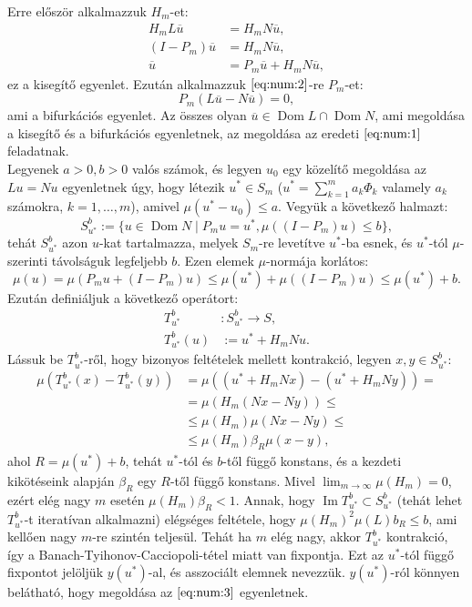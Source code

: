 \documentclass[oneside, titlepage, 12pt, a4paper]{report}
\DeclareMathOperator{\Ima}{Im}	%
\DeclareMathOperator{\Dom}{Dom}	%
\begin{document}
Erre először alkalmazzuk $H_m$-et:
\begin{align}
H_m L \overline{u} &= H_m N \overline{u}, \nonumber \\
(I - P_m) \overline{u} &= H_m N \overline{u}, \nonumber \\
\overline{u} &= P_m \overline{u} + H_m N \overline{u}, \label{eq:num:3}
\end{align}
ez a kisegítő egyenlet. Ezután alkalmazzuk $\eqref{eq:num:2}$-re $P_m$-et: %
\begin{equation}
P_m(L \overline{u} - N \overline{u}) = 0, \label{eq:num:4}
\end{equation}
ami a bifurkációs egyenlet. Az összes olyan $\overline{u} \in \Dom L \cap \Dom N$, ami megoldása a kisegítő és a bifurkációs egyenletnek, az megoldása az eredeti $\eqref{eq:num:1}$ feladatnak. \\ %
Legyenek $a > 0, b > 0$ valós számok, és legyen $u_0$ egy közelítő megoldása az $Lu = Nu$ egyenletnek úgy, hogy létezik $u^* \in S_m$ ($u^* = \sum_{k=1}^m a_k \Phi_k$ valamely $a_k$ számokra, $k = 1, \dots, m$), amivel $\mu(u^* - u_0) \leq a$. Vegyük a következő halmazt:
\begin{equation*}
S_{u^*}^b := \{ u \in \Dom N \; | \; P_m u = u^*, \mu((I - P_m)u) \leq b \},
\end{equation*}
tehát $S_{u^*}^b$ azon $u$-kat tartalmazza, melyek $S_m$-re levetítve $u^*$-ba esnek, és $u^*$-tól $\mu$-szerinti távolságuk legfeljebb $b$. Ezen elemek $\mu$-normája korlátos:
\begin{equation*}
\mu(u) = \mu(P_m u + (I - P_m) u) \leq \mu(u^*) + \mu((I - P_m)u) \leq \mu(u^*) + b.
\end{equation*}
 Ezután definiáljuk a következő operátort:
\begin{align*}
T_{u^*}^b &: S_{u^*}^b \rightarrow S, \\
T_{u^*}^b (u) &:= u^* + H_m N u.
\end{align*}
Lássuk be $T_{u^*}^b$-ről, hogy bizonyos feltételek mellett kontrakció, legyen $x, y \in S_{u^*}^b$:
\begin{align*}
\mu( T_{u^*}^b(x) - T_{u^*}^b(y)) &= \mu((u^* + H_m N x) - (u^* + H_m N y)) = \\
&= \mu(H_m(N x - N y)) \leq \\
&\leq \mu(H_m) \mu(N x - N y) \leq \\
&\leq \mu(H_m) \beta_R \mu(x - y),
\end{align*}
ahol $R = \mu(u^*) + b$, tehát $u^*$-tól és $b$-től függő konstans, és a kezdeti kikötéseink alapján $\beta_R$ egy $R$-től függő konstans. Mivel $\lim_{m \to \infty} \mu(H_m) = 0$, ezért elég nagy $m$ esetén $\mu(H_m) \beta_R < 1$. Annak, hogy $\Ima  T_{u^*}^b \subset S_{u^*}^b$ (tehát lehet $ T_{u^*}^b$-t iteratívan alkalmazni) elégséges feltétele, hogy $\mu(H_m)^2 \mu(L) b_R \leq b$, ami kellően nagy $m$-re szintén teljesül. Tehát ha $m$ elég nagy, akkor $ T_{u^*}^b$ kontrakció, így a Banach-Tyihonov-Cacciopoli-tétel miatt van fixpontja. Ezt az $u^*$-tól függő fixpontot jelöljük $y(u^*)$-al, és asszociált elemnek nevezzük. $y(u^*)$-ról könnyen belátható, hogy megoldása az $\eqref{eq:num:3}$ egyenletnek. \\ %
\end{document}
